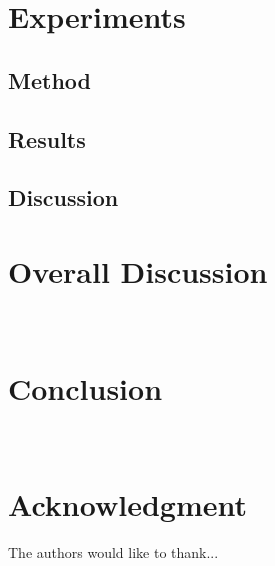\documentclass[conference]{IEEEtran}
\begin{document}
	\section{Experiments}
	\subsection{Method}
	\subsection{Results}
	\subsection{Discussion}
	\section{Overall Discussion}
	
	~\cite{Sorg2003VisualTA}
	\section{Conclusion}
	~\cite{forpheus}
	~\cite{WilliamsII2003}
	~\cite{festofin}
	
	
	\section*{Acknowledgment}
	
	
	The authors would like to thank...
	
	
	
	
	
	
	
	
	{}
	
	
\end{document}
